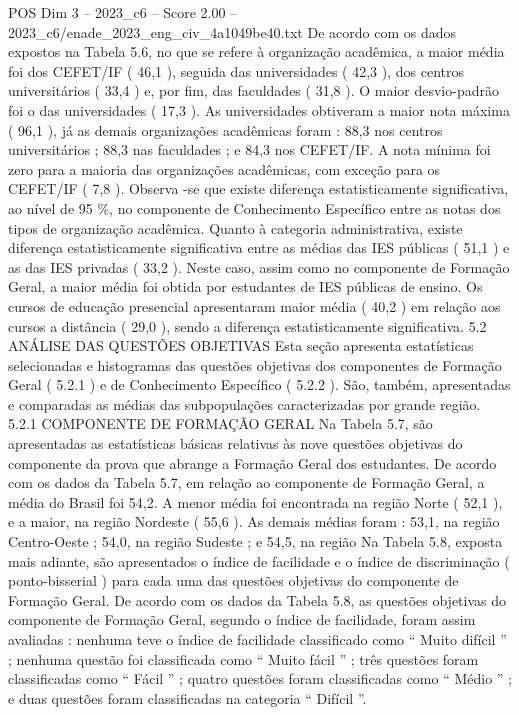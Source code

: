 \begin{textsample}{POS Dim 3 – 2023\_c6 – Score 2.00 – 2023\_c6/enade\_2023\_eng\_civ\_4a1049be40.txt}
De acordo com os dados expostos na Tabela 5.6, no que se refere à organização acadêmica, a maior média foi dos CEFET/IF ( 46,1 ), seguida das universidades ( 42,3 ), dos centros universitários ( 33,4 ) e, por fim, das faculdades ( 31,8 ).
O maior desvio-padrão foi o das universidades ( 17,3 ).
As universidades obtiveram a maior nota máxima ( 96,1 ), já as demais organizações acadêmicas foram : 88,3 nos centros universitários ; 88,3 nas faculdades ; e 84,3 nos CEFET/IF.
A nota mínima foi zero para a maioria das organizações acadêmicas, com exceção para os CEFET/IF ( 7,8 ).
Observa -se que existe diferença estatisticamente significativa, ao nível de 95 \%, no componente de Conhecimento Específico entre as notas dos tipos de organização acadêmica.
Quanto à categoria administrativa, existe diferença estatisticamente significativa entre as médias das IES públicas ( 51,1 ) e as das IES privadas ( 33,2 ).
Neste caso, assim como no componente de Formação Geral, a maior média foi obtida por estudantes de IES públicas de ensino.
Os cursos de educação presencial apresentaram maior média ( 40,2 ) em relação aos cursos a distância ( 29,0 ), sendo a diferença estatisticamente significativa. 5.2 ANÁLISE DAS QUESTÕES OBJETIVAS Esta seção apresenta estatísticas selecionadas e histogramas das questões objetivas dos componentes de Formação Geral ( 5.2.1 ) e de Conhecimento Específico ( 5.2.2 ).
São, também, apresentadas e comparadas as médias das subpopulações caracterizadas por grande região. 5.2.1 COMPONENTE DE FORMAÇÃO GERAL Na Tabela 5.7, são apresentadas as estatísticas básicas relativas às nove questões objetivas do componente da prova que abrange a Formação Geral dos estudantes.
De acordo com os dados da Tabela 5.7, em relação ao componente de Formação Geral, a média do Brasil foi 54,2.
A menor média foi encontrada na região Norte ( 52,1 ), e a maior, na região Nordeste ( 55,6 ).
As demais médias foram : 53,1, na região Centro-Oeste ; 54,0, na região Sudeste ; e 54,5, na região Na Tabela 5.8, exposta mais adiante, são apresentados o índice de facilidade e o índice de discriminação ( ponto-bisserial ) para cada uma das questões objetivas do componente de Formação Geral.
De acordo com os dados da Tabela 5.8, as questões objetivas do componente de Formação Geral, segundo o índice de facilidade, foram assim avaliadas : nenhuma teve o índice de facilidade classificado como “ Muito difícil ” ; nenhuma questão foi classificada como “ Muito fácil ” ; três questões foram classificadas como “ Fácil ” ; quatro questões foram classificadas como “ Médio ” ; e duas questões foram classificadas na categoria “ Difícil ”.

\end{textsample}
